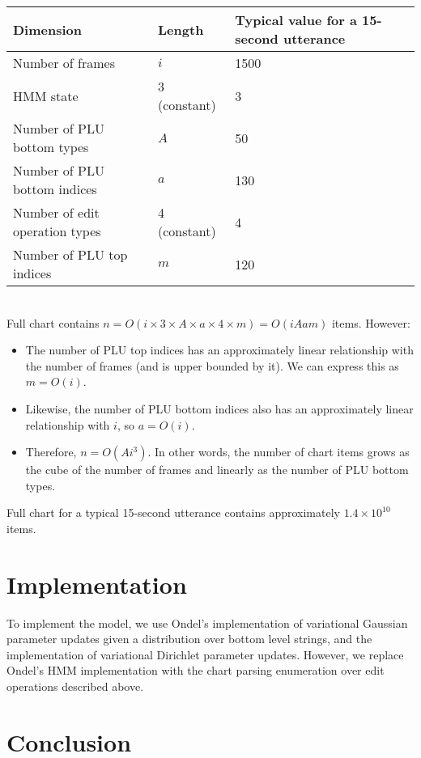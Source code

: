 \documentclass[11pt]{article}
\begin{document}
\noindent\begin{tabular}{ l l l }
  Dimension & Length & Typical value for a 15-second utterance \\\hline
  Number of frames & $i$ & 1500 \\
  HMM state & 3 (constant) & 3 \\
  Number of PLU bottom types & $A$ & 50 \\
  Number of PLU bottom indices & $a$ & 130 \\
  Number of edit operation types & 4 (constant) & 4 \\
  Number of PLU top indices & $m$ & 120\\
\end{tabular} \\

\noindent Full chart contains $n = O(i \times 3 \times A \times a \times 4 \times m) = O(iAam)$ items. However:
\begin{itemize}
	\item The number of PLU top indices has an approximately linear relationship with the number of frames (and is upper bounded by it). We can express this as $m=O(i)$.
	\item Likewise, the number of PLU bottom indices also has an approximately linear relationship with $i$, so $a=O(i)$. 
	\item Therefore, $n=O(Ai^3)$. In other words, the number of chart items grows as the cube of the number of frames and linearly as the number of PLU bottom types.
\end{itemize}

\noindent Full chart for a typical 15-second utterance contains approximately $1.4 \times 10^{10}$ items.


\section{Implementation}

To implement the model, we use Ondel's implementation of variational Gaussian parameter updates given a distribution over bottom level strings, and the implementation of variational Dirichlet parameter updates. However, we replace Ondel's HMM implementation with the chart parsing enumeration over edit operations described above.

\section{Conclusion}
\end{document}
